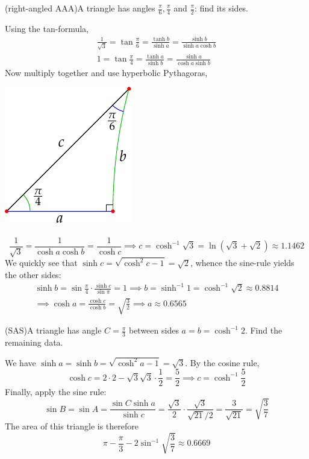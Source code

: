 \begin{examples}{}{}
\exstart (right-angled AAA)\lstsp A triangle has angles $\frac\pi 6,\frac\pi 4$ and $\frac\pi 2$: find its sides.
\begin{enumerate}\setcounter{enumi}{1}
  \begin{minipage}[t]{0.71\linewidth}\vspace{-10pt}
  \item[] Using the tan-formula,
  \begin{gather*}
  \frac 1{\sqrt 3}=\tan\frac\pi 6=\frac{\tanh b}{\sinh a}=\frac{\sinh b}{\sinh a\cosh b}\\
  1=\tan\frac\pi 4=\frac{\tanh a}{\sinh b}=\frac{\sinh a}{\cosh a\sinh b}
  \end{gather*}
  Now multiply together and use hyperbolic Pythagoras,
  \end{minipage}
  \begin{minipage}[t]{0.28\linewidth}\vspace{-20pt}
  \flushright\includegraphics{isom-right2}
  \end{minipage}\par
  \[\frac 1{\sqrt 3}=\frac 1{\cosh a\cosh b}=\frac 1{\cosh c}\implies c=\cosh^{-1}\sqrt 3=\ln(\sqrt 3+\sqrt 2)\approx 1.1462\]
  We quickly see that $\sinh c=\sqrt{\cosh^2c-1}=\sqrt 2$, whence the sine-rule yields the other sides:
  \begin{gather*}
  \sinh b=\sin\frac\pi 4\cdot\frac{\sinh c}{\sin\pi}=1 \implies b=\sinh^{-1} 1 =\cosh^{-1}\sqrt 2\approx 0.8814\\
  \implies \cosh a=\frac{\cosh c}{\cosh b}=\sqrt{\frac 32} \implies a\approx 0.6565
  \end{gather*}
 

  \item (SAS)\quad A triangle has angle $C=\frac{\pi}3$ between sides $a=b=\cosh^{-1}2$. Find the remaining data.\smallbreak

	We have $\sinh a=\sinh b=\sqrt{\cosh^2\!a-1}=\sqrt 3$. By the cosine rule,
	\[\cosh c=2\cdot 2-\sqrt 3\sqrt 3\cdot \frac 12 =\frac 52\implies c=\cosh^{-1}\frac 52\]
	Finally, apply the sine rule:
	\[\sin B=\sin A=\frac{\sin C\sinh a}{\sinh c}=\frac{\sqrt 3}2\cdot\frac{\sqrt 3}{\sqrt{21}/2}=\frac 3{\sqrt{21}}=\sqrt{\frac 37}\]
 	The area of this triangle is therefore
 	\[\pi-\frac{\pi}3-2\sin^{-1}\sqrt{\frac 37}\approx 0.6669\]
\end{enumerate}
\end{examples}





